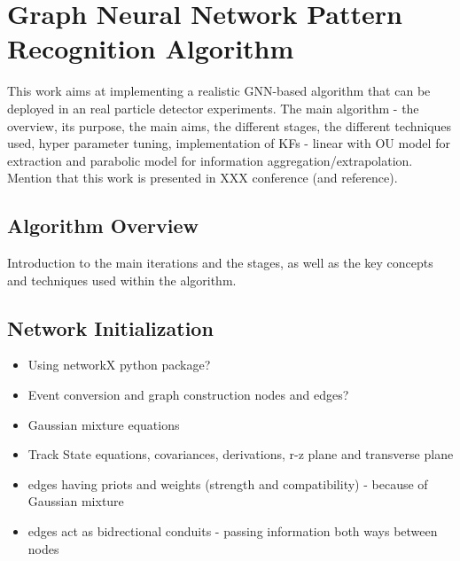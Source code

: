 
\chapter{Graph Neural Network Pattern Recognition Algorithm}\label{chapter-5}




This work aims at implementing a realistic GNN-based algorithm that can be deployed in an real particle detector experiments.
The main algorithm - the overview, its purpose, the main aims, the different stages, the different techniques used, hyper parameter tuning, implementation of KFs - linear with OU model for extraction and parabolic model for information aggregation/extrapolation.
Mention that this work is presented in XXX conference (and reference).



\section{Algorithm Overview}
Introduction to the main iterations and the stages, as well as the key concepts and techniques used within the algorithm.



\section{Network Initialization}
\begin{itemize}
\item Using networkX python package?
\item Event conversion and graph construction nodes and edges?
\item Gaussian mixture equations
\item Track State equations, covariances, derivations, r-z plane and transverse plane
\item edges having priots and weights (strength and compatibility) - because of Gaussian mixture
\item edges act as bidrectional conduits - passing information both ways between nodes
\end{itemize}

